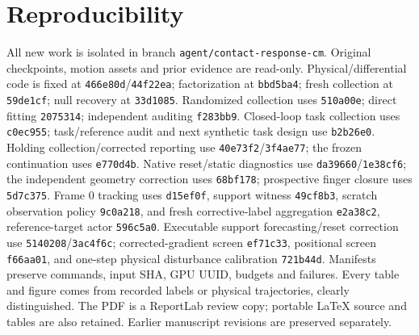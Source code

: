 \documentclass[10 pt]{article}
\begin{document}
\section*{Reproducibility}
All new work is isolated in branch \texttt{agent/contact-response-cm}. Original
checkpoints, motion assets and prior evidence are read-only. Physical/differential
code is fixed at \texttt{466e80d}/\texttt{44f22ea}; factorization at
\texttt{bbd5ba4}; fresh collection at \texttt{59de1cf}; null recovery at
\texttt{33d1085}. Randomized collection uses \texttt{510a00e}; direct fitting
\texttt{2075314}; independent auditing \texttt{f283bb9}. Closed-loop task
collection uses \texttt{c0ec955}; task/reference audit and next synthetic task
design use \texttt{b2b26e0}. Holding collection/corrected reporting use
\texttt{40e73f2}/\texttt{3f4ae77}; the frozen continuation uses \texttt{e770d4b}.
Native reset/static diagnostics use \texttt{da39660}/\texttt{1e38cf6}; the independent
geometry correction uses \texttt{68bf178}; prospective finger closure uses \texttt{5d7c375}. Frame 0 tracking uses \texttt{d15ef0f},
support witness \texttt{49cf8b3}, scratch observation policy \texttt{9c0a218}, and
fresh corrective-label aggregation \texttt{e2a38c2}, reference-target actor \texttt{596c5a0}.
Executable support forecasting/reset correction use \texttt{5140208}/\texttt{3ac4f6c};
corrected-gradient screen \texttt{ef71c33}, positional screen \texttt{f66aa01},
and one-step physical disturbance calibration \texttt{721b44d}.
Manifests preserve commands, input SHA, GPU UUID,
budgets and failures. Every table and figure comes from recorded labels or physical trajectories, clearly distinguished.
The PDF is a ReportLab review copy; portable LaTeX source and tables are also
retained. Earlier manuscript revisions are preserved separately.
\end{document}
